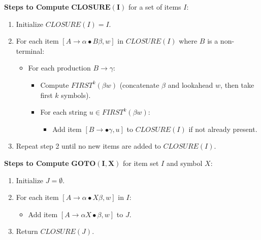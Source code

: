 \textbf{Steps to Compute} $\mathbf{CLOSURE(I)}$ for a set of items $I$:
\begin{enumerate}
\item Initialize $CLOSURE(I) = I$.
\item For each item $[A \to \alpha \bullet B \beta, w]$ in $CLOSURE(I)$ where $B$ is a non-terminal:
   \begin{itemize}
   \item For each production $B \to \gamma$:
     \begin{itemize}
     \item Compute $FIRST^k(\beta w)$ (concatenate $\beta$ and lookahead $w$, then take first $k$ symbols).
     \item For each string $u \in FIRST^k(\beta w)$:
       \begin{itemize}
       \item Add item $[B \to \bullet \gamma, u]$ to $CLOSURE(I)$ if not already present.
       \end{itemize}
     \end{itemize}
   \end{itemize}
\item Repeat step 2 until no new items are added to $CLOSURE(I)$.
\end{enumerate}

\textbf{Steps to Compute} $\mathbf{GOTO(I, X)}$ for item set $I$ and symbol $X$:
\begin{enumerate}
\item Initialize $J = \emptyset$.
\item For each item $[A \to \alpha \bullet X \beta, w]$ in $I$:
   \begin{itemize}
   \item Add item $[A \to \alpha X \bullet \beta, w]$ to $J$.
   \end{itemize}
\item Return $CLOSURE(J)$.
\end{enumerate}

